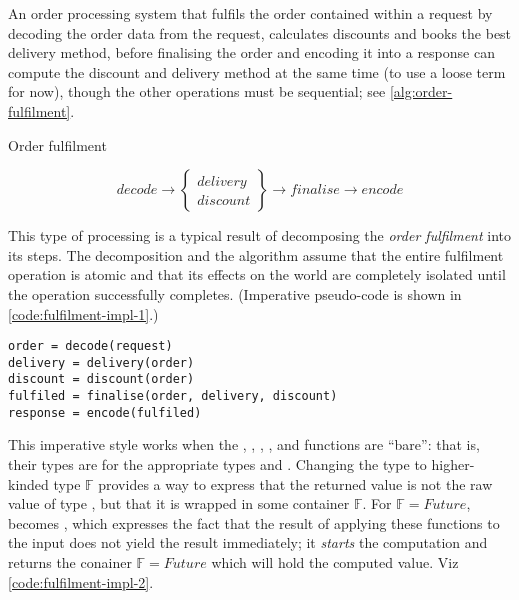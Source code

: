 An order processing system that fulfils the order contained within a request by decoding the order data from the request, calculates discounts and books the best delivery method, before finalising the order and encoding it into a response can compute the discount and delivery method at the same time (to use a loose term for now), though the other operations must be sequential; see \autoref{alg:order-fulfilment}.

\begin{algorithm}
  \caption{Order fulfilment}
  \label{alg:order-fulfilment}
  \DontPrintSemicolon
  
  \[ 
    decode \rightarrow
    \left \{\begin{array}{l}
      delivery \\ discount
      \end{array}
    \right \} \rightarrow finalise \rightarrow encode
  \]
\end{algorithm} 

This type of processing is a typical result of decomposing the \emph{order fulfilment} into its steps. The decomposition and the algorithm assume that the entire fulfilment operation is atomic and that its effects on the world are completely isolated until the  operation successfully completes. (Imperative pseudo-code is shown in \autoref{code:fulfilment-impl-1}.)

\begin{lstlisting}[caption={Fulfilment implementation I}, label={code:fulfilment-impl-1}, language=Pseudo, escapechar=|]
order = decode(request)
delivery = delivery(order)
discount = discount(order)
fulfiled = finalise(order, delivery, discount)
response = encode(fulfiled)
\end{lstlisting}

This imperative style works when the , , , , and  functions are ``bare'': that is, their types are  for the appropriate types  and . Changing the type  to higher-kinded type $\mathds{F}$ provides a way to express that the returned value is not the raw value of type , but that it is wrapped in some container $\mathds{F}$. For $\mathds{F} = Future$,  becomes , which expresses the fact that the result of applying these functions to the input does not yield the result immediately; it \emph{starts} the computation and returns the conainer $\mathds{F} = Future$ which will hold the computed value. Viz \autoref{code:fulfilment-impl-2}.

